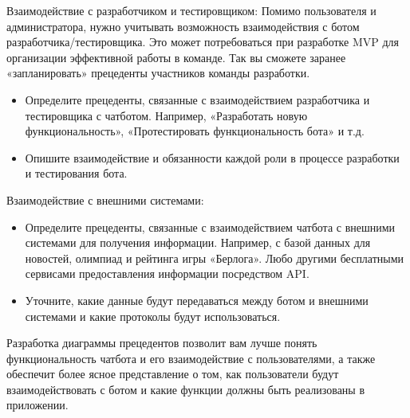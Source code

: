 \documentclass[letterpaper,10pt,russian]{sphinxmanual}
\begin{document}
 Взаимодействие с разработчиком и тестировщиком:
Помимо пользователя и администратора, нужно учитывать возможность взаимодействия с ботом разработчика/тестировщика. Это может потребоваться при разработке MVP для организации эффективной работы в команде. Так вы сможете заранее «запланировать» прецеденты участников команды разработки.
\begin{itemize}
\item {} 
\sphinxAtStartPar
Определите прецеденты, связанные с взаимодействием разработчика и тестировщика с чат\sphinxhyphen{}ботом. Например, «Разработать новую функциональность», «Протестировать функциональность бота» и т.д.

\item {} 
\sphinxAtStartPar
Опишите взаимодействие и обязанности каждой роли в процессе разработки и тестирования бота.

\end{itemize}

 Взаимодействие с внешними системами:
\begin{itemize}
\item {} 
\sphinxAtStartPar
Определите прецеденты, связанные с взаимодействием чат\sphinxhyphen{}бота с внешними системами для получения информации. Например, с базой данных для новостей, олимпиад и рейтинга игры «Берлога». Любо другими бесплатными сервисами предоставления информации посредством API.

\item {} 
\sphinxAtStartPar
Уточните, какие данные будут передаваться между ботом и внешними системами и какие протоколы будут использоваться.

\end{itemize}

\sphinxAtStartPar
Разработка диаграммы прецедентов позволит вам лучше понять функциональность чат\sphinxhyphen{}бота и его взаимодействие с пользователями, а также обеспечит более ясное представление о том, как пользователи будут взаимодействовать с ботом и какие функции должны быть реализованы в приложении.
\end{document}
